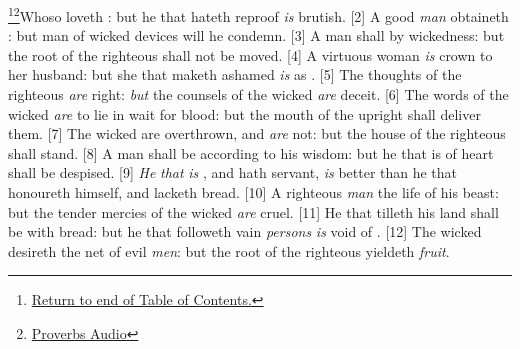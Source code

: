 \footnote{\textcolor[cmyk]{0.99998,1,0,0}{\hyperlink{TOC}{Return to end of Table of Contents.}}}\footnote{\href{https://www.audioverse.org/english/audiobibles/books/ENGKJV/O/Prov/1}{\textcolor[cmyk]{0.99998,1,0,0}{Proverbs Audio}}}\textcolor[cmyk]{0.99998,1,0,0}{Whoso  loveth : but he that hateth reproof \emph{is} brutish.}
[2] \textcolor[cmyk]{0.99998,1,0,0}{A good \emph{man} obtaineth  : but  man of wicked devices will he condemn.}
[3] \textcolor[cmyk]{0.99998,1,0,0}{A man shall    by wickedness: but the root of the righteous shall not be moved.}
[4] \textcolor[cmyk]{0.99998,1,0,0}{A virtuous woman \emph{is}  crown to her husband: but she that maketh ashamed \emph{is} as .}
[5] \textcolor[cmyk]{0.99998,1,0,0}{The thoughts of the righteous \emph{are} right: \emph{but} the counsels of the wicked \emph{are} deceit.}
[6] \textcolor[cmyk]{0.99998,1,0,0}{The words of the wicked \emph{are} to lie in wait for blood: but the mouth of the upright shall deliver them.}
[7] \textcolor[cmyk]{0.99998,1,0,0}{The wicked are overthrown, and \emph{are} not: but the house of the righteous shall stand.}
[8] \textcolor[cmyk]{0.99998,1,0,0}{A man shall be  according to his wisdom: but he that is of   heart shall be despised.}
[9] \textcolor[cmyk]{0.99998,1,0,0}{\emph{He} \emph{that} \emph{is} , and hath  servant, \emph{is} better than he that honoureth himself, and lacketh bread.}
[10] \textcolor[cmyk]{0.99998,1,0,0}{A righteous \emph{man}  the life of his beast: but the tender mercies of the wicked \emph{are} cruel.}
[11] \textcolor[cmyk]{0.99998,1,0,0}{He that tilleth his land shall be  with bread: but he that followeth vain \emph{persons} \emph{is} void of .}
[12] \textcolor[cmyk]{0.99998,1,0,0}{The wicked desireth the net of evil \emph{men}: but the root of the righteous yieldeth \emph{fruit}.}
